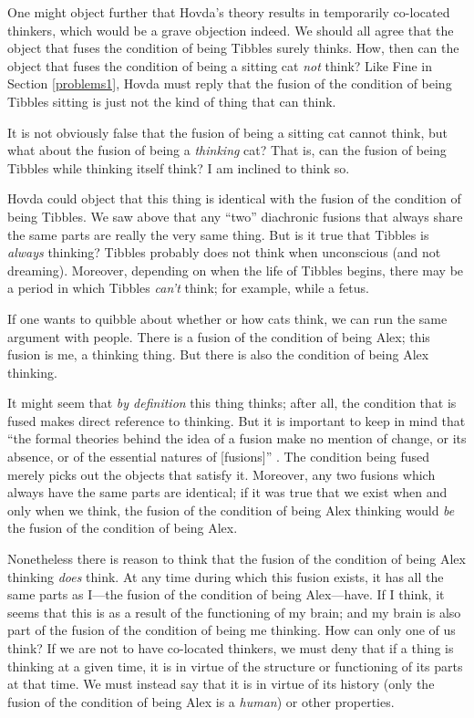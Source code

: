 \documentclass[11pt]{article}
\begin{document}
\begin{spacing}{1.5}
One might object further that Hovda's theory results in temporarily
co-located thinkers, which would be a grave objection indeed.  We
should all agree that the object that fuses the condition of being
Tibbles surely thinks.  How, then can the object that fuses the
condition of being a sitting cat {\em not} think?  Like Fine in
Section \ref{problems1}, Hovda must reply that the fusion of the
condition of being Tibbles sitting is just not the kind of thing that
can think.

It is not obviously false that the fusion of being a sitting cat
cannot think, but what about the fusion of being a {\em thinking} cat?
That is, can the fusion of being Tibbles while thinking itself think?
I am inclined to think so.

Hovda could object that this thing is identical with the fusion of the
condition of being Tibbles.  We saw above that any ``two'' diachronic
fusions that always share the same parts are really the very same
thing.  But is it true that Tibbles is {\em always} thinking?  Tibbles
probably does not think when unconscious (and not dreaming).
Moreover, depending on when the life of Tibbles begins, there may be a
period in which Tibbles {\em can't} think; for example, while a fetus.

If one wants to quibble about whether or how cats think, we can run
the same argument with people.  There is a fusion of the condition of
being Alex; this fusion is me, a thinking thing.  But there is also
the condition of being Alex thinking.

It might seem that {\em by definition} this thing thinks; after all,
the condition that is fused makes direct reference to thinking.  But
it is important to keep in mind that ``the formal theories behind the
idea of a fusion make no mention of change, or its absence, or of the
essential natures of [fusions]'' \citep[sec. 1]{hovda2011}.  The
condition being fused merely picks out the objects that satisfy it.
Moreover, any two fusions which always have the same parts are
identical; if it was true that we exist when and only when we think,
the fusion of the condition of being Alex thinking would {\em be} the
fusion of the condition of being Alex.

Nonetheless there is reason to think that the fusion of the condition
of being Alex thinking {\em does} think.  At any time during which
this fusion exists, it has all the same parts as I---the fusion of the
condition of being Alex---have.  If I think, it seems that this is as
a result of the functioning of my brain; and my brain is also part of
the fusion of the condition of being me thinking.  How can only one of
us think?  If we are not to have co-located thinkers, we must deny
that if a thing is thinking at a given time, it is in virtue of the
structure or functioning of its parts at that time.  We must instead
say that it is in virtue of its history (only the fusion of the
condition of being Alex is a {\em human}) or other properties.


\end{spacing}
\end{document}
